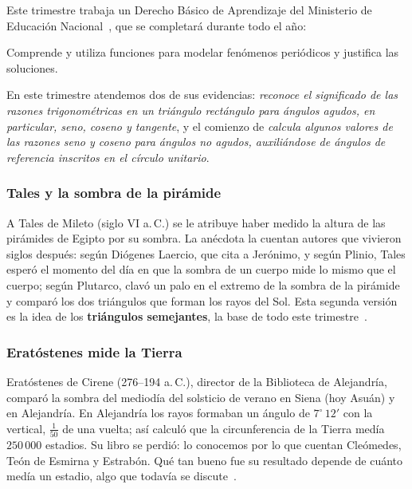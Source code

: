 \documentclass[11pt]{article}
\begin{document}
Este trimestre trabaja un Derecho Básico de Aprendizaje del Ministerio de
Educación Nacional~\cite{mendba}, que se completará durante todo el año:

\begin{dba}
Comprende y utiliza funciones para modelar fenómenos periódicos y justifica las
soluciones.
\end{dba}

En este trimestre atendemos dos de sus evidencias: \emph{reconoce el
significado de las razones trigonométricas en un triángulo rectángulo para
ángulos agudos, en particular, seno, coseno y tangente}, y el comienzo de
\emph{calcula algunos valores de las razones seno y coseno para ángulos no
agudos, auxiliándose de ángulos de referencia inscritos en el círculo unitario}.


\subsubsection*{Tales y la sombra de la pirámide}

A Tales de Mileto (siglo VI a.\,C.) se le atribuye haber medido la altura de
las pirámides de Egipto por su sombra. La anécdota la cuentan autores que
vivieron siglos después: según Diógenes Laercio, que cita a Jerónimo, y según
Plinio, Tales esperó el momento del día en que la sombra de un cuerpo mide lo
mismo que el cuerpo; según Plutarco, clavó un palo en el extremo de la sombra
de la pirámide y comparó los dos triángulos que forman los rayos del Sol. Esta
segunda versión es la idea de los \textbf{triángulos semejantes}, la base de
todo este trimestre~\cite{mactutortales}.

\subsubsection*{Eratóstenes mide la Tierra}

Eratóstenes de Cirene (276--194 a.\,C.), director de la Biblioteca de
Alejandría, comparó la sombra del mediodía del solsticio de verano en Siena
(hoy Asuán) y en Alejandría. En Alejandría los rayos formaban un ángulo de
$7^\circ\,12'$ con la vertical, $\frac{1}{50}$ de una vuelta; así calculó que la
circunferencia de la Tierra medía $250\,000$ estadios. Su libro se perdió: lo
conocemos por lo que cuentan Cleómedes, Teón de Esmirna y Estrabón. Qué tan
bueno fue su resultado depende de cuánto medía un estadio, algo que todavía se
discute~\cite{mactutoreratostenes}.
\end{document}
